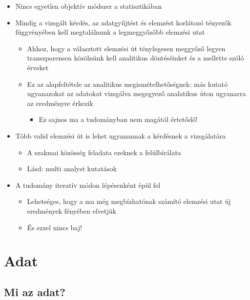 \documentclass[
  letterpaper,
  DIV=11,
  numbers=noendperiod]{scrreprt}
\providecommand{\tightlist}{%
  \setlength{\itemsep}{0pt}\setlength{\parskip}{0pt}}\usepackage{longtable,booktabs,array}
\begin{document}
\begin{itemize}
\item
  Nincs egyetlen objektív módszer a statisztikában
\item
  Mindig a vizsgált kérdés, az adatgyűjtést és elemzést korlátozó
  tényezők függvényében kell megtalálnunk a legmeggyőzőbb elemzési utat

  \begin{itemize}
  \item
    Ahhoz, hogy a választott elemzési út ténylegesen meggyőző legyen
    transzparensen közölnünk kell analitikus döntéséinket és a mellette
    szóló érveket
  \item
    Ez az alapfeltétele az analitikus megismételhetőségnek: más kutató
    ugyanazokat az adatokat vizsgálva megegyező analatikus úton
    ugyanarra az eredményre érkezik

    \begin{itemize}
    \tightlist
    \item
      Ez sajnos ma a tudományban nem magától értetődő!
    \end{itemize}
  \end{itemize}
\item
  Több valid elemzési út is lehet ugyanannak a kérdésnek a vizsgálatára

  \begin{itemize}
  \item
    A szakmai közösség feladata ezeknek a felülbírálata
  \item
    Lásd: multi analyst kutatások
  \end{itemize}
\item
  A tudomány iteratív módon lépésenként épül fel

  \begin{itemize}
  \item
    Lehetséges, hogy a ma még megbízhatónak számító elemzési utat új
    eredmények fényében elvetjük
  \item
    És ezzel nincs baj!
  \end{itemize}
\end{itemize}


\hypertarget{adat}{%
\chapter{Adat}\label{adat}}

\hypertarget{mi-az-adat}{%
\section{Mi az adat?}\label{mi-az-adat}}
\end{document}
